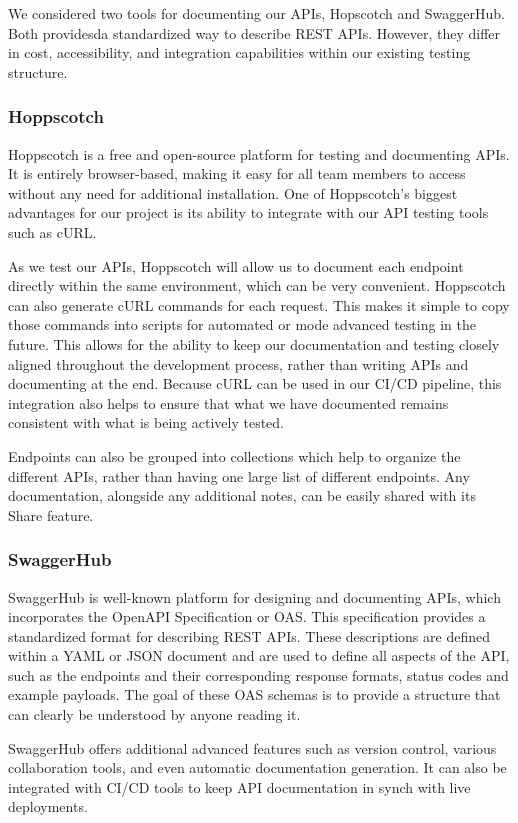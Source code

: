 \documentclass[12pt]{article}
\begin{document}
We considered two tools for documenting our APIs, Hopscotch and SwaggerHub. Both providesda standardized way to describe REST APIs. However, they differ in cost, accessibility, and integration capabilities within our existing testing structure.
\subsubsection{Hoppscotch}
Hoppscotch is a free and open-source platform for testing and documenting APIs. It is entirely browser-based, making it easy for all team members to access without any need for additional installation. One of Hoppscotch’s biggest advantages for our project is its ability to integrate with our API testing tools such as cURL.

As we test our APIs, Hoppscotch will allow us to document each endpoint directly within the same environment, which can be very convenient. Hoppscotch can also generate cURL commands for each request. This makes it simple to copy those commands into scripts for automated or mode advanced testing in the future. This allows for the ability to keep our documentation and testing closely aligned throughout the development process, rather than writing APIs and documenting at the end. Because cURL can be used in our CI/CD pipeline, this integration also helps to ensure that what we have documented remains consistent with what is being actively tested.

Endpoints can also be grouped into collections which help to organize the different APIs, rather than having one large list of different endpoints. Any documentation, alongside any additional notes, can be easily shared with its Share feature.
\subsubsection{SwaggerHub}
SwaggerHub is well-known platform for designing and documenting APIs, which incorporates the OpenAPI Specification or OAS. This specification provides a standardized format for describing REST APIs. These descriptions are defined within a YAML or JSON document and are used to define all aspects of the API, such as the endpoints and their corresponding response formats, status codes and example payloads. The goal of these OAS schemas is to provide a structure that can clearly be understood by anyone reading it.

SwaggerHub offers additional advanced features such as version control, various collaboration tools, and even automatic documentation generation. It can also be integrated with CI/CD tools to keep API documentation in synch with live deployments. 
\end{document}
